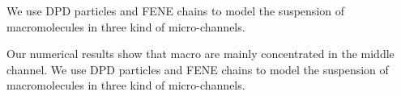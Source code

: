 \documentclass[12pt]{article}
\begin{document}
We use DPD particles and FENE chains to model the suspension of macromolecules in three kind of micro-channels. 

Our numerical results show that macro are mainly concentrated in the middle channel. We use DPD particles and FENE chains to model the suspension of macromolecules in three kind of micro-channels. 




\end{document}

